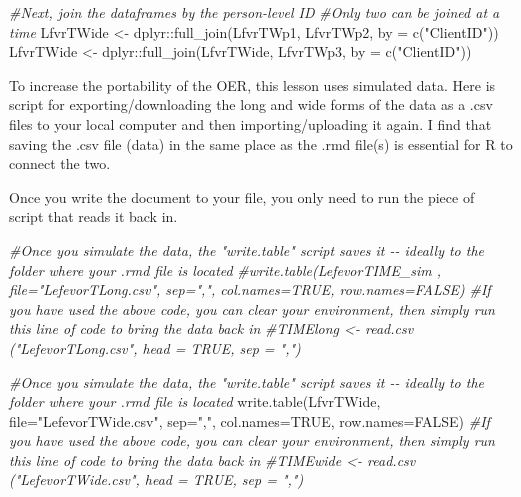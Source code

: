 \documentclass[
  english,
]{book}
\newenvironment{Shaded}{\begin{snugshade}}{\end{snugshade}}
\newcommand{\AttributeTok}[1]{\textcolor[rgb]{0.77,0.63,0.00}{#1}}
\newcommand{\CommentTok}[1]{\textcolor[rgb]{0.56,0.35,0.01}{\textit{#1}}}
\newcommand{\ConstantTok}[1]{\textcolor[rgb]{0.00,0.00,0.00}{#1}}
\newcommand{\FunctionTok}[1]{\textcolor[rgb]{0.00,0.00,0.00}{#1}}
\newcommand{\NormalTok}[1]{#1}
\newcommand{\OtherTok}[1]{\textcolor[rgb]{0.56,0.35,0.01}{#1}}
\newcommand{\SpecialCharTok}[1]{\textcolor[rgb]{0.00,0.00,0.00}{#1}}
\newcommand{\StringTok}[1]{\textcolor[rgb]{0.31,0.60,0.02}{#1}}
\begin{document}
\begin{Shaded}
\begin{Highlighting}[]
\CommentTok{\#Next, join the dataframes by the person{-}level ID}
\CommentTok{\#Only two can be joined at a time}
\NormalTok{LfvrTWide }\OtherTok{\textless{}{-}}\NormalTok{ dplyr}\SpecialCharTok{::}\FunctionTok{full\_join}\NormalTok{(LfvrTWp1, LfvrTWp2, }\AttributeTok{by =} \FunctionTok{c}\NormalTok{(}\StringTok{"ClientID"}\NormalTok{))}
\NormalTok{LfvrTWide }\OtherTok{\textless{}{-}}\NormalTok{ dplyr}\SpecialCharTok{::}\FunctionTok{full\_join}\NormalTok{(LfvrTWide, LfvrTWp3,  }\AttributeTok{by =} \FunctionTok{c}\NormalTok{(}\StringTok{"ClientID"}\NormalTok{))}
\end{Highlighting}
\end{Shaded}

To increase the portability of the OER, this lesson uses simulated data. Here is script for exporting/downloading the long and wide forms of the data as a .csv files to your local computer and then importing/uploading it again. I find that saving the .csv file (data) in the same place as the .rmd file(s) is essential for R to connect the two.

Once you write the document to your file, you only need to run the piece of script that reads it back in.

\begin{Shaded}
\begin{Highlighting}[]
\CommentTok{\#Once you simulate the data, the "write.table" script saves it {-}{-} ideally to the folder where your .rmd file is located}
\CommentTok{\#write.table(LefevorTIME\_sim , file="LefevorTLong.csv", sep=",", col.names=TRUE, row.names=FALSE)}
\CommentTok{\#If you have used the above code, you can clear your environment, then simply run this line of code to bring the data back in}
\CommentTok{\#TIMElong \textless{}{-} read.csv ("LefevorTLong.csv", head = TRUE, sep = ",")}
\end{Highlighting}
\end{Shaded}

\begin{Shaded}
\begin{Highlighting}[]
\CommentTok{\#Once you simulate the data, the "write.table" script saves it {-}{-} ideally to the folder where your .rmd file is located}
\FunctionTok{write.table}\NormalTok{(LfvrTWide, }\AttributeTok{file=}\StringTok{"LefevorTWide.csv"}\NormalTok{, }\AttributeTok{sep=}\StringTok{","}\NormalTok{, }\AttributeTok{col.names=}\ConstantTok{TRUE}\NormalTok{, }\AttributeTok{row.names=}\ConstantTok{FALSE}\NormalTok{)}
\CommentTok{\#If you have used the above code, you can clear your environment, then simply run this line of code to bring the data back in}
\CommentTok{\#TIMEwide \textless{}{-} read.csv ("LefevorTWide.csv", head = TRUE, sep = ",")}
\end{Highlighting}
\end{Shaded}
\end{document}

